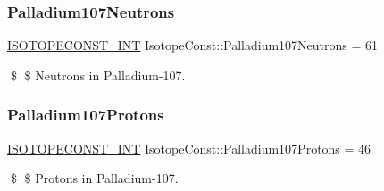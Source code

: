 \subsubsection{\texorpdfstring{Palladium107\+Neutrons}{Palladium107Neutrons}}
{\footnotesize\ttfamily \mbox{\hyperlink{group___isotope_const-_macros_ga5f18360b3e99483a35c32d789e62621c}{I\+S\+O\+T\+O\+P\+E\+C\+O\+N\+S\+T\+\_\+\+I\+NT}} Isotope\+Const\+::\+Palladium107\+Neutrons = 61}

\$ \$ Neutrons in Palladium-\/107. \mbox{\label{group___isotope_const-_palladium-_pd107_ga8410ea9a5fb77fc15bdec7b6b4a061fd}} 
\subsubsection{\texorpdfstring{Palladium107\+Protons}{Palladium107Protons}}
{\footnotesize\ttfamily \mbox{\hyperlink{group___isotope_const-_macros_ga5f18360b3e99483a35c32d789e62621c}{I\+S\+O\+T\+O\+P\+E\+C\+O\+N\+S\+T\+\_\+\+I\+NT}} Isotope\+Const\+::\+Palladium107\+Protons = 46}

\$ \$ Protons in Palladium-\/107. 